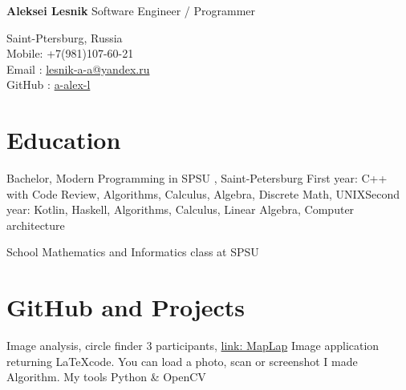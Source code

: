 \documentclass[12pt,a4paper]{moderncv}
\begin{document}

	\begin{minipage} {0.7\textwidth}
		\begin{flushleft}
			\huge \textbf{Aleksei Lesnik} 
			\newline
			\textcolor[gray]{0.4} {
			    \indent Software Engineer / Programmer\\
			}
			\normalsize
		\end{flushleft}
	\end{minipage}
	\begin{minipage} {0.3\textwidth}
		\begin{flushright}
			\textcolor[gray]{0.4} {
				\indent Saint-Ptersburg, Russia\\
				\indent Mobile: +7(981)107-60-21  \\
				\indent Email : \textcolor{blue} {\href{mailto:lesnik-a-a@yandex.ru} {lesnik-a-a@yandex.ru}}\\ 
				\indent GitHub : \textcolor{blue} {\href{https://github.com/a-alex-l} {a-alex-l}}\\  	
			}
		\end{flushright}
	\end{minipage}

    \section{Education}
    
         {Bachelor, Modern Programming in SPSU} {}{} {\textcolor{blue} {}, Saint-Petersburg} {First year: C++ with Code Review, Algorithms, Calculus, Algebra, Discrete Math, UNIX\newline  Second year: Kotlin, Haskell, Algorithms, Calculus, Linear Algebra, Computer architecture}
    
         {School} {}{} {Mathematics and Informatics class at SPSU} {}
        
    \section{GitHub and Projects}
        
         {Image analysis, circle finder} {3 participants, \textcolor{blue} {\href{https://github.com/a-alex-l/MapLap} {link: MapLap}}} {} {\newline Image application returning \LaTeX code. You can load a photo, scan or screenshot} {I made Algorithm. My tools \textcolor{Attention} {Python \& OpenCV} }
        
\end{document}
